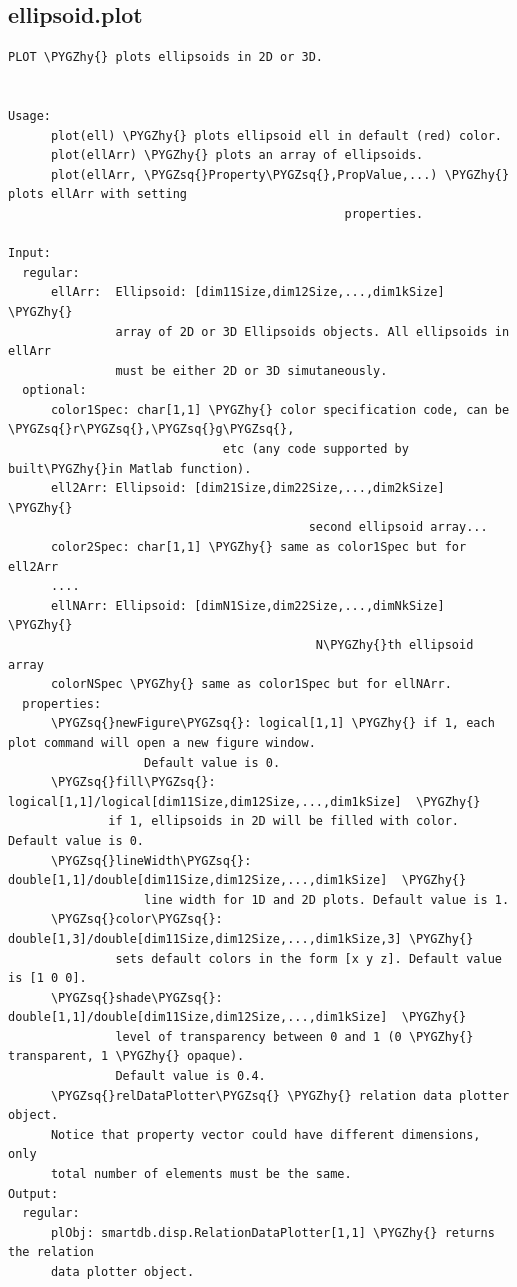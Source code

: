 \documentclass[letterpaper,10pt,english]{sphinxmanual}
\def\PYGZhy{\char`\-}
\def\PYGZsq{\char`\'}
\begin{document}
\subsection{ellipsoid.plot}
\label{chap_functions:ellipsoid-plot}
\begin{Verbatim}[commandchars=\\\{\}]
PLOT \PYGZhy{} plots ellipsoids in 2D or 3D.


Usage:
      plot(ell) \PYGZhy{} plots ellipsoid ell in default (red) color.
      plot(ellArr) \PYGZhy{} plots an array of ellipsoids.
      plot(ellArr, \PYGZsq{}Property\PYGZsq{},PropValue,...) \PYGZhy{} plots ellArr with setting
                                               properties.

Input:
  regular:
      ellArr:  Ellipsoid: [dim11Size,dim12Size,...,dim1kSize] \PYGZhy{}
               array of 2D or 3D Ellipsoids objects. All ellipsoids in ellArr
               must be either 2D or 3D simutaneously.
  optional:
      color1Spec: char[1,1] \PYGZhy{} color specification code, can be \PYGZsq{}r\PYGZsq{},\PYGZsq{}g\PYGZsq{},
                              etc (any code supported by built\PYGZhy{}in Matlab function).
      ell2Arr: Ellipsoid: [dim21Size,dim22Size,...,dim2kSize] \PYGZhy{}
                                          second ellipsoid array...
      color2Spec: char[1,1] \PYGZhy{} same as color1Spec but for ell2Arr
      ....
      ellNArr: Ellipsoid: [dimN1Size,dim22Size,...,dimNkSize] \PYGZhy{}
                                           N\PYGZhy{}th ellipsoid array
      colorNSpec \PYGZhy{} same as color1Spec but for ellNArr.
  properties:
      \PYGZsq{}newFigure\PYGZsq{}: logical[1,1] \PYGZhy{} if 1, each plot command will open a new figure window.
                   Default value is 0.
      \PYGZsq{}fill\PYGZsq{}: logical[1,1]/logical[dim11Size,dim12Size,...,dim1kSize]  \PYGZhy{}
              if 1, ellipsoids in 2D will be filled with color. Default value is 0.
      \PYGZsq{}lineWidth\PYGZsq{}: double[1,1]/double[dim11Size,dim12Size,...,dim1kSize]  \PYGZhy{}
                   line width for 1D and 2D plots. Default value is 1.
      \PYGZsq{}color\PYGZsq{}: double[1,3]/double[dim11Size,dim12Size,...,dim1kSize,3] \PYGZhy{}
               sets default colors in the form [x y z]. Default value is [1 0 0].
      \PYGZsq{}shade\PYGZsq{}: double[1,1]/double[dim11Size,dim12Size,...,dim1kSize]  \PYGZhy{}
               level of transparency between 0 and 1 (0 \PYGZhy{} transparent, 1 \PYGZhy{} opaque).
               Default value is 0.4.
      \PYGZsq{}relDataPlotter\PYGZsq{} \PYGZhy{} relation data plotter object.
      Notice that property vector could have different dimensions, only
      total number of elements must be the same.
Output:
  regular:
      plObj: smartdb.disp.RelationDataPlotter[1,1] \PYGZhy{} returns the relation
      data plotter object.


\end{Verbatim}
\end{document}
